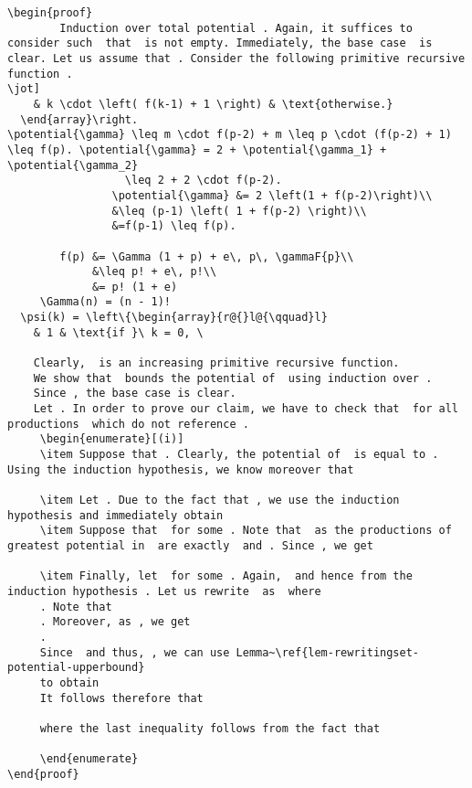 \documentclass[11pt,a4paper]{amsart}
\theoremstyle{definition}
\newcommand{\potential}[1]{\pi(#1)}
\newcommand{\gammaF}[1]{\Gamma(#1,1)}
\begin{document}
\begin{lstlisting}
\begin{proof}
        Induction over total potential . Again, it suffices to consider such  that  is not empty. Immediately, the base case  is clear. Let us assume that . Consider the following primitive recursive function .
\jot]
    & k \cdot \left( f(k-1) + 1 \right) & \text{otherwise.}
  \end{array}\right.
\potential{\gamma} \leq m \cdot f(p-2) + m \leq p \cdot (f(p-2) + 1) \leq f(p). \potential{\gamma} = 2 + \potential{\gamma_1} + \potential{\gamma_2}
                  \leq 2 + 2 \cdot f(p-2).
				\potential{\gamma} &= 2 \left(1 + f(p-2)\right)\\
				&\leq (p-1) \left( 1 + f(p-2) \right)\\
				&=f(p-1) \leq f(p).
				
        f(p) &= \Gamma (1 + p) + e\, p\, \gammaF{p}\\
             &\leq p! + e\, p!\\
             &= p! (1 + e)
     \Gamma(n) = (n - 1)! 
  \psi(k) = \left\{\begin{array}{r@{}l@{\qquad}l}
    & 1 & \text{if }\ k = 0, \

    Clearly,  is an increasing primitive recursive function.
    We show that  bounds the potential of  using induction over .
    Since , the base case is clear.
    Let . In order to prove our claim, we have to check that  for all productions  which do not reference .
     \begin{enumerate}[(i)]
     \item Suppose that . Clearly, the potential of  is equal to . Using the induction hypothesis, we know moreover that
     
     \item Let . Due to the fact that , we use the induction hypothesis and immediately obtain 
     \item Suppose that  for some . Note that  as the productions of greatest potential in  are exactly  and . Since , we get
     
     \item Finally, let  for some . Again,  and hence from the induction hypothesis . Let us rewrite  as  where
     . Note that
     . Moreover, as , we get
     .
     Since  and thus, , we can use Lemma~\ref{lem-rewritingset-potential-upperbound}
     to obtain 
     It follows therefore that
     
     where the last inequality follows from the fact that
     
     \end{enumerate}
\end{proof}


\end{lstlisting}
\end{document}
